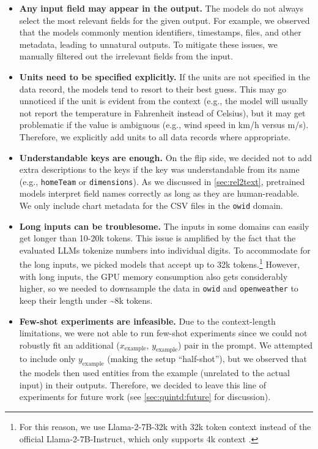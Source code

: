 \begin{itemize}


    \item\textbf{Any input field may appear in the output.} The models do not always select the most relevant fields for the given output. For example, we observed that the models commonly mention identifiers, timestamps, files, and other metadata, leading to unnatural outputs. To mitigate these issues, we manually filtered out the irrelevant fields from the input.

    \item\textbf{Units need to be specified explicitly.} If the units are not specified in the data record, the models tend to resort to their best guess. This may go unnoticed if the unit is evident from the context (e.g., the model will usually not report the temperature in Fahrenheit instead of Celsius), but it may get problematic if the value is ambiguous (e.g., wind speed in km/h versus m/s). Therefore, we explicitly add units to all data records where appropriate.

    \item\textbf{Understandable keys are enough.} On the flip side, we decided not to add extra descriptions to the keys if the key was understandable from its name (e.g., \texttt{homeTeam} or \texttt{dimensions}). As we discussed in \autoref{sec:rel2text}, pretrained models interpret field names correctly as long as they are human-readable. We only include chart metadata for the CSV files in the \texttt{owid} domain.

    \item\textbf{Long inputs can be troublesome.} The inputs in some domains can easily get longer than 10-20k tokens. This issue is amplified by the fact that the evaluated LLMs tokenize numbers into individual digits. To accommodate for the long inputs, we picked models that accept up to 32k tokens.\footnote{For this reason, we use Llama-2-7B-32k with 32k token context \cite{llama-2-7b-32k} instead of the official Llama-2-7B-Instruct, which only supports 4k context \cite{touvronLlamaOpenFoundation2023}.} However, with long inputs, the GPU memory consumption also gets considerably higher, so we needed to downsample the data in \texttt{owid} and \texttt{openweather} to keep their length under \textasciitilde 8k tokens.


    \item\textbf{Few-shot experiments are infeasible.} Due to the context-length limitations, we were not able to run few-shot experiments since we could not robustly fit an additional ($x_\text{example}$, $y_\text{example}$) pair in the prompt. We attempted to include only $y_\text{example}$ (making the setup ``half-shot''), but we observed that the models then used entities from the example (unrelated to the actual input) in their outputs. Therefore, we decided to leave this line of experiments for future work (see \autoref{sec:quintd:future} for discussion).


\end{itemize}
